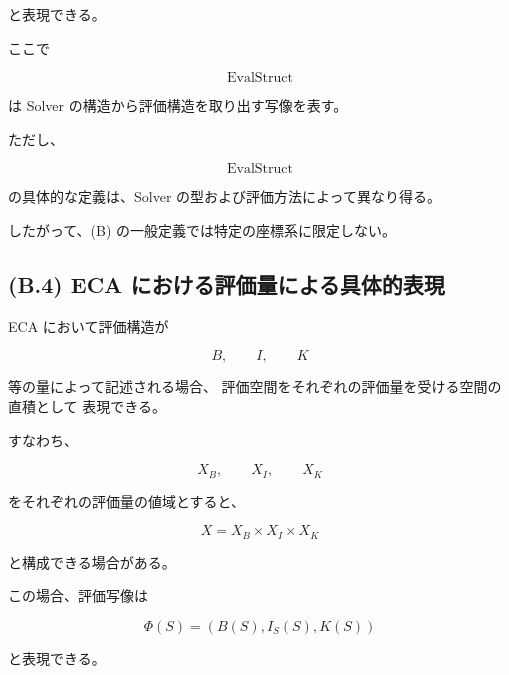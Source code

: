 \documentclass[a4paper,11pt]{article}
\begin{document}
と表現できる。

ここで

\begin{equation}
    \operatorname{EvalStruct}
\end{equation}

は Solver の構造から評価構造を取り出す写像を表す。

ただし、

\begin{equation}
    \operatorname{EvalStruct}
\end{equation}

の具体的な定義は、Solver の型および評価方法によって異なり得る。

したがって、(B) の一般定義では特定の座標系に限定しない。


\subsection{(B.4) ECA における評価量による具体的表現}
\label{subsec:B4}

ECA において評価構造が

\begin{equation}
    B,\qquad I,\qquad K
\end{equation}

等の量によって記述される場合、
評価空間をそれぞれの評価量を受ける空間の直積として
表現できる。

すなわち、

\begin{equation}
    X_B,\qquad
    X_I,\qquad
    X_K
\end{equation}

をそれぞれの評価量の値域とすると、

\begin{equation}
    \boxed{
        X
        =
        X_B
        \times
        X_I
        \times
        X_K
    }
    \label{eq:B-product-space}
\end{equation}

と構成できる場合がある。

この場合、評価写像は

\begin{equation}
    \boxed{
        \Phi(S)
        =
        \left(
            B(S),
            I_S(S),
            K(S)
        \right)
    }
    \label{eq:B-coordinate-evaluation}
\end{equation}

と表現できる。
\end{document}
